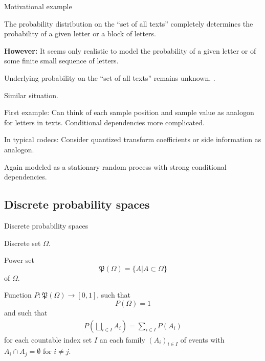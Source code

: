 \begin{frame}{Motivational example}
\begin{minipage}[t]{0.9\linewidth}
\bit\small
\item The probability distribution on the ``set of all texts'' completely determines the probability 
of a given letter or a block of letters. 
\item \textbf{However: } It seems only realistic to model the probability of a given letter or of some finite small sequence of letters. 
\item Underlying probability on the ``set of all texts'' remains unknown.
\eit 
\smallskip
{}.
\end{minipage}

\begin{minipage}[t]{0.9\linewidth}
 Similar situation.
\bit\small
\item First example: Can think of each sample position and sample value as analogon for letters in texts. Conditional dependencies 
more complicated. 
\item In typical codecs: Consider quantized transform coefficients or side information as analogon. 
\item Again modeled as a stationary random process with strong conditional dependencies. 
\eit
\smallskip
{} 
\end{minipage}


\end{frame}



\subsection{Discrete probability spaces}

\begin{frame}{Discrete probability spaces}
\bit
\item 
{} Discrete set  $\Omega$. 
\item {} Power set 
\[
\mathfrak{P}(\Omega)=\{A|A\subset\Omega\}
\]
of $\Omega$. 
\item {} Function $P:\mathfrak{P}(\Omega)\to[0,1]$, such that
\begin{equation*}
P(\Omega)=1
\end{equation*}
and such that
\begin{align*}
P(\bigsqcup_{i\in I}A_i)=\sum_{i\in I}P(A_i)
\end{align*}
for each countable index set $I$ an each family $(A_i)_{i\in I}$ of events with $A_i\cap A_j=\emptyset$ for $i\neq j$. 
\eit 
\end{frame}


